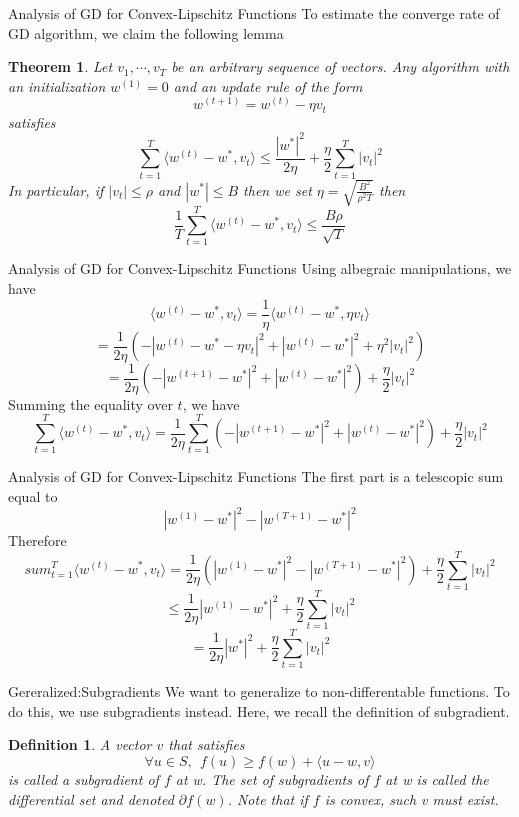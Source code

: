\documentclass{beamer}
\newtheorem*{dfn}{Definition}
\newtheorem{thm}{Theorem}[subsection]
\begin{document}
\begin{frame}{Analysis of GD for Convex-Lipschitz Functions}
	To estimate the converge rate of GD algorithm, we claim the following lemma
	\begin{thm}
		Let $v_1, \cdots,v_T$ be an arbitrary sequence of vectors. Any algorithm with an initialization $w^{(1)}=0$ and an update rule of the form
		\[w^{(t+1)} = w^{(t)} - \eta v_t\]
		satisfies
\[\sum^T_{t=1} \langle w^{(t)} - w^*, v_t \rangle \leq \frac{|w^*|^2}{2 \eta} + \frac{\eta}{2} \sum^T_{t=1} |v_t|^2\]
In particular, if $|v_t| \leq \rho$ and $|w^*| \leq B$ then we set $\eta = \sqrt{\frac{B^2}{\rho^2 T}}$ then
\[\frac{1}{T} \sum^T_{t=1} \langle w^{(t)} - w^*,v_t \rangle \leq \frac{B \rho}{\sqrt{T}}\]
	\end{thm}
\end{frame}
\begin{frame}{Analysis of GD for Convex-Lipschitz Functions}
	Using albegraic manipulations, we have 
	\[\langle w^{(t)} - w^*,v_t \rangle = \frac{1}{\eta} \langle w^{(t)} - w^*, \eta v_t \rangle\]
	\[= \frac{1}{2 \eta} (-|w^{(t)} - w^* - \eta v_t |^2 + |w^{(t)} - w^*|^2 + \eta^2 |v_t|^2)\]
	\[= \frac{1}{2\eta} ( - |w^{(t+1)} - w^*|^2 + |w^{(t)} - w^*|^2) + \frac{\eta}{2} |v_t|^2\]
	Summing the equality over $t$, we have 
	\[\sum^T_{t=1} \langle w^{(t)} - w^*,v_t \rangle = \frac{1}{2 \eta} \sum^T_{t=1} ( - |w^{(t+1)} - w^*|^2 + |w^{(t)} - w^*|^2) + \frac{\eta}{2} |v_t|^2\]
\end{frame}
\begin{frame}{Analysis of GD for Convex-Lipschitz Functions}
The first part is a telescopic sum equal to 
\[|w^{(1)} - w^*|^2 - |w^{(T+1)} - w^*|^2\]
Therefore
\[sum^T_{t=1} \langle w^{(t)} - w^*,v_t \rangle = \frac{1}{2 \eta} (|w^{(1)} - w^*|^2 - |w^{(T+1)} - w^*|^2) + \frac{\eta}{2} \sum^T_{t=1} |v_t|^2\]
\[\leq \frac{1}{2 \eta} |w^{(1)} - w^*|^2 + \frac{\eta}{2} \sum^T_{t=1} |v_t|^2\]
\[= \frac{1}{2 \eta} |w^*|^2 + \frac{\eta}{2} \sum^T_{t=1} |v_t|^2\]
\end{frame}
\begin{frame}{Gereralized:Subgradients}
	We want to generalize to non-differentable functions. To do this, we use subgradients instead. Here, we recall the definition of subgradient.
	\begin{dfn}
		A vector $v$ that satisfies 
		\[\forall u \in S, \ \ f(u) \geq f(w) + \langle u-w,v \rangle\]
		is called a subgradient of $f$ at w. The set of subgradients of $f$ at w is called  the differential set and denoted $\partial f(w)$. Note that if $f$ is convex, such v must exist.
	\end{dfn}
\end{frame}
\end{document}
